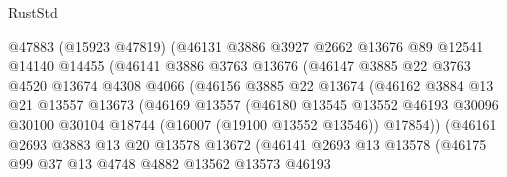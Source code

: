 \begin{lexlean}{RustStd}
\begin{coremodule}
                        @47883
                        (@15923 @47819)
                        (@46131
                          @3886
                          @3927
                          @2662
                          @13676
                          @89
                          @12541
                          @14140
                          @14455
                          (@46141
                            @3886
                            @3763
                            @13676
                            (@46147
                              @3885
                              @22
                              @3763
                              @4520
                              @13674
                              @4308
                              @4066
                              (@46156
                                @3885
                                @22
                                @13674
                                (@46162
                                  @3884
                                  @13
                                  @21
                                  @13557
                                  @13673
                                  (@46169
                                    @13557
                                    (@46180
                                      @13545
                                      @13552
                                      @46193
                                      @30096
                                      @30100
                                      @30104
                                      @18744
                                      (@16007 (@19100 @13552 @13546))
                                      @17854))
                                  (@46161
                                    @2693
                                    @3883
                                    @13
                                    @20
                                    @13578
                                    @13672
                                    (@46141
                                      @2693
                                      @13
                                      @13578
                                      (@46175
                                        @99
                                        @37
                                        @13
                                        @4748
                                        @4882
                                        @13562
                                        @13573
                                        @46193

\end{coremodule}
\end{lexlean}
